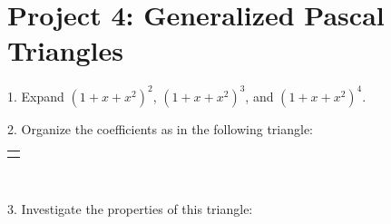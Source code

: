 \documentclass[10pt,]{book}
\theoremstyle{plain}
\theoremstyle{definition}
\theoremstyle{definition}
\numberwithin{equation}{chapter}
\newlength{\panelmax}
\begin{document}
\section[{Project 4: Generalized Pascal Triangles}]{Project 4: Generalized Pascal Triangles}\label{exercises-8}
\begin{exerciselist}
\item[1.]\hypertarget{exercise-91}{}\hypertarget{p-226}{}%
Expand \({\left( 1 + x + x^{2} \right)}^{2}\), \(\left( 1 + x + x^{2} \right)^{3}\), and \(\left( 1 + x + x^{2} \right)^{4}\).%
\par\smallskip
\item[2.]\hypertarget{exercise-92}{}\hypertarget{p-227}{}%
Organize the coefficients as in the following triangle:%
{%
\setlength{\panelmax}{0pt}
\ifdefined\panelboxAtabular\else\newsavebox{\panelboxAtabular}\fi%
\ifdefined\phAtabular\else\newlength{\phAtabular}\fi%
\setlength{\phAtabular}{\ht\panelboxAtabular+\dp\panelboxAtabular}
\settototalheight{\phAtabular}{\usebox{\panelboxAtabular}}
\setlength{\panelmax}{\maxof{\panelmax}{\phAtabular}}
\leavevmode%
\setlength{\tabcolsep}{0\linewidth}
\par\medskip\noindent
\hspace*{0.1\linewidth}%
\begin{tabular}{@{}*{1}{c}@{}}
\begin{minipage}[c][\panelmax][t]{0.8\linewidth}\usebox{\panelboxAtabular}\end{minipage}\end{tabular}\\
}%
\par\smallskip
\item[3.]\hypertarget{exercise-93}{}\hypertarget{p-228}{}%
Investigate the properties of this triangle: \leavevmode%
\begin{enumerate}[label=(\alph*)]

\end{enumerate}
\end{exerciselist}
\end{document}
